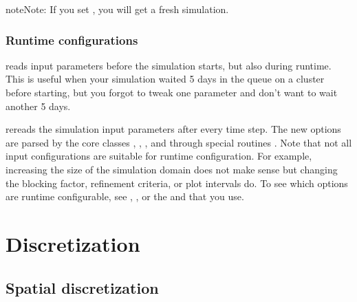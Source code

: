 \documentclass[letterpaper,10pt,english]{sphinxmanual}
\begin{document}
\begin{sphinxadmonition}{note}{Note:}
\sphinxAtStartPar
If you set , you will get a fresh simulation.
\end{sphinxadmonition}


\subsection{Run\sphinxhyphen{}time configurations}
\label{\detokenize{Base/Control:run-time-configurations}}\label{\detokenize{Base/Control:chap-runtimeconfig}}
\sphinxAtStartPar
{} reads input parameters before the simulation starts, but also during run\sphinxhyphen{}time.
This is useful when your simulation waited 5 days in the queue on a cluster before starting, but you forgot to tweak one parameter and don’t want to wait another 5 days.

\sphinxAtStartPar
{} re\sphinxhyphen{}reads the simulation input parameters after every time step.
The new options are parsed by the core classes , , , and  through special routines .
Note that not all input configurations are suitable for run\sphinxhyphen{}time configuration.
For example, increasing the size of the simulation domain does not make sense but changing the blocking factor, refinement criteria, or plot intervals do.
To see which options are run\sphinxhyphen{}time configurable, see {\hyperref[\detokenize{Source/Driver:chap-driver}]{}}, {\hyperref[\detokenize{Source/AmrMesh:chap-amrmesh}]{}}, or the {\hyperref[\detokenize{Source/TimeStepper:chap-timestepper}]{}} and {\hyperref[\detokenize{Source/CellTagger:chap-celltagger}]{}} that you use.


\chapter{Discretization}
\label{\detokenize{index:discretization}}
\sphinxstepscope


\section{Spatial discretization}
\label{\detokenize{Source/SpatialDiscretization:spatial-discretization}}\label{\detokenize{Source/SpatialDiscretization:chap-spatialdiscretization}}\label{\detokenize{Source/SpatialDiscretization::doc}}
\end{document}
